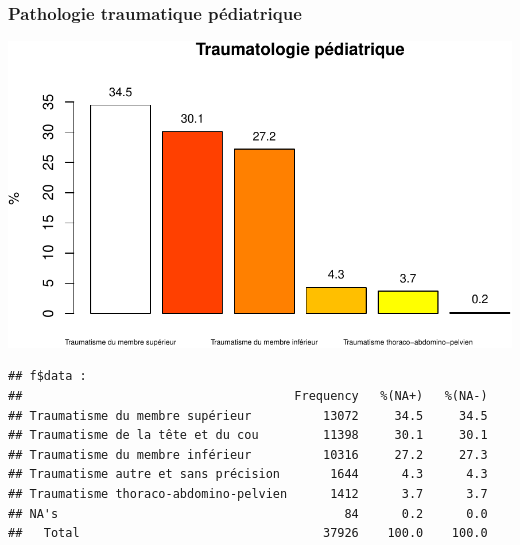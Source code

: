 \documentclass[]{article}
\newenvironment{Shaded}{\begin{snugshade}}{\end{snugshade}}
\newcommand{\KeywordTok}[1]{\textcolor[rgb]{0.13,0.29,0.53}{\textbf{{#1}}}}
\newcommand{\DataTypeTok}[1]{\textcolor[rgb]{0.13,0.29,0.53}{{#1}}}
\newcommand{\FloatTok}[1]{\textcolor[rgb]{0.00,0.00,0.81}{{#1}}}
\newcommand{\StringTok}[1]{\textcolor[rgb]{0.31,0.60,0.02}{{#1}}}
\newcommand{\NormalTok}[1]{{#1}}
\begin{document}
\subsubsection{Pathologie traumatique
pédiatrique}\label{pathologie-traumatique-pediatrique}

\begin{Shaded}
\end{Shaded}

\includegraphics{analyse_merge_files/figure-latex/chap_ped_trau-1.pdf}

\begin{verbatim}
## f$data : 
##                                      Frequency   %(NA+)   %(NA-)
## Traumatisme du membre supérieur          13072     34.5     34.5
## Traumatisme de la tête et du cou         11398     30.1     30.1
## Traumatisme du membre inférieur          10316     27.2     27.3
## Traumatisme autre et sans précision       1644      4.3      4.3
## Traumatisme thoraco-abdomino-pelvien      1412      3.7      3.7
## NA's                                        84      0.2      0.0
##   Total                                  37926    100.0    100.0
\end{verbatim}
\end{document}
